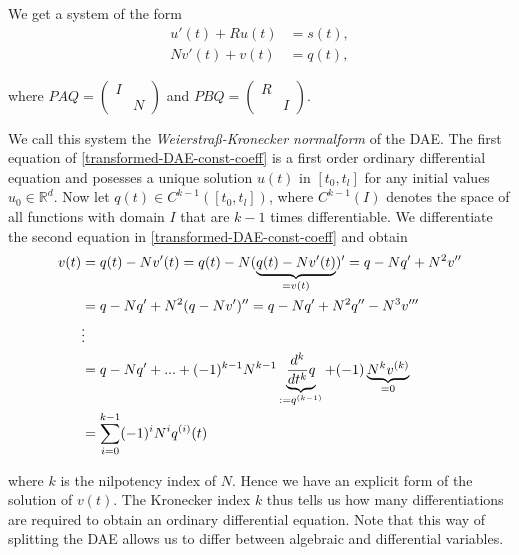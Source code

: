 We get a system of the form
\begin{equation}
	\label{transformed-DAE-const-coeff}
	\begin{aligned}
		u'(t) + Ru(t) &= s(t), \\
		Nv'(t) + v(t) &= q(t),
	\end{aligned}
\end{equation}

where $PAQ = 
\left( 
\begin{matrix}
	I & \\
	 & N
\end{matrix} 
\right)$
and $PBQ = 
\left( 
\begin{matrix}
	R & \\
	 & I
\end{matrix} 
\right)$.

We call this system the\emph{ Weierstraß-Kronecker normalform} of the DAE. The first equation of \eqref{transformed-DAE-const-coeff} is a first order ordinary differential equation and posesses a unique solution $u(t)$ in $[t_0,t_l]$ for any initial values $u_0 \in \mathbb{R}^d$. Now let $q(t) \in C^{k-1}([t_0,t_l])$, where $C^{k-1}(I)$ denotes the space of all functions with domain $I$ that are $k-1$ times differentiable. We differentiate the second equation in \eqref{transformed-DAE-const-coeff} and obtain
\begin{align}
	\notag
	v(t) &= q(t) - Nv'(t) = q(t) - N(\underbrace{q(t)-Nv'(t)}_{=v(t)})' = q-Nq'+N^2v'' \\ \notag
	&= q-Nq'+N^2(q-Nv')'' = q-Nq'+N^2q''-N^3v''' \\ \notag
	&\vdots \\ \notag
	&= q-Nq'+...+(-1)^{k-1}N^{k-1}\underbrace{\frac{d^k}{dt^k}q}_{:=q^{(k-1)}}+(-1) \underbrace{N^kv^{(k)}}_{=0}\\ 
	\label{solution-to-transformed-DAE-const-coeff-part2}
	&= \sum_{i=0}^{k-1} (-1)^iN^iq^{(i)}(t)
\end{align}

where $k$ is the nilpotency index of $N$. Hence we have an explicit  form of the solution of $v(t)$. The Kronecker index $k$ thus tells us how many differentiations are required to obtain an ordinary differential equation. Note that this way of splitting the DAE allows us to differ between algebraic and differential variables.

